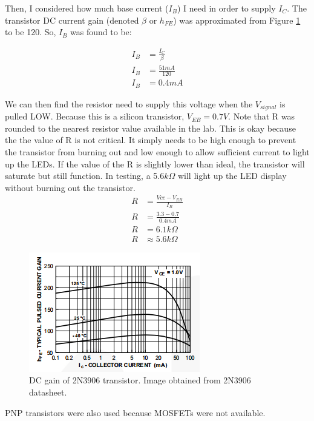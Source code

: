 \documentclass[11pt]{article}
\begin{document}
Then, I considered how much base current ($I_{B}$) I need in order to supply $I_{C}$. The transistor DC current gain (denoted $\beta$ or $h_{FE}$) was approximated from Figure \ref{fig:2N3906_gain} to be 120. So, $I_{B}$ was found to be: 

\begin{align*}
I_{B} &= \frac{I_{C}}{\beta} \\
I_{B} &= \frac{51mA}{120} \\
I_{B} &= 0.4mA
\end{align*}

We can then find the resistor need to supply this voltage when the $V_{signal}$ is pulled LOW. Because this is a silicon transistor, $V_{EB}=0.7V$.  Note that R was rounded to the nearest resistor value available in the lab. This is okay because the the value of R is not critical. It simply needs to be high enough to prevent the transistor from burning out and low enough to allow sufficient current to light up the LEDs. If the value of the R is slightly lower than ideal, the transistor will saturate but still function. In testing, a 5.6$k\Omega$ will light up the LED display without burning out the transistor. \\

\begin{align*}
R &= \frac{Vcc-V_{EB}}{I_{B}} \\
R &= \frac{3.3-0.7}{0.4mA} \\
R &= 6.1k\Omega	\\
R &\approx 5.6k\Omega
\end{align*}



\begin{figure}[h!]
\centering
\includegraphics[scale=1]{2N3906_gain.png}
\caption{DC gain of 2N3906 transistor. Image obtained from 2N3906 datasheet.}
\label{fig:2N3906_gain}
\end{figure} 


PNP transistors were also used because MOSFETs were not available. 
\end{document}
